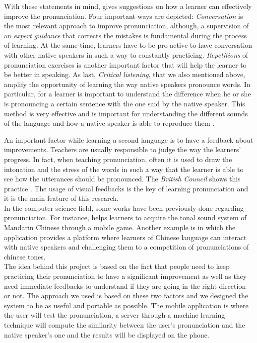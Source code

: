 \noindent With these statements in mind, \cite{gilakjani2011pronunciation} gives suggestions on how a learner can effectively improve the pronunciation. Four important ways are depicted: \textit{Conversation} is the most relevant approach to improve pronunciation, although, a supervision of an \textit{expert guidance} that corrects the mistakes is fundamental during the process of learning. At the same time, learners have to be pro-active to have conversation with other native speakers in such a way to constantly practicing. \textit{Repetitions} of pronunciation exercises is another important factor that will help the learner to be better in speaking. As last, \textit{Critical listening}, that we also mentioned above, amplify the opportunity of learning the way native speakers pronounce words. In particular, for a learner is important to understand the difference when he or she is pronouncing a certain sentence with the one said by the native speaker. This method is very effective and is important for understanding the different sounds of the language and how a native speaker is able to reproduce them \cite{rost2014listening}.

\noindent An important factor while learning a second language is to have a feedback about improvements. Teachers are usually responsible to judge the way the learners' progress. In fact, when teaching pronunciation, often it is used to draw the intonation and the stress of the words in such a way that the learner is able to see how the utterances should be pronounced. The \textit{British Council} shows this practice \cite{bbc_stress}. The usage of visual feedbacks is the key of learning pronunciation and it is the main feature of this research. \\

\noindent In the computer science field, some works have been previously done regarding pronunciation. For instance, \cite{edge2012tip} helps learners to acquire the tonal sound system of Mandarin Chinese through a mobile game. Another example is \cite{head2014tonewars} in which the application provides a platform where learners of Chinese language can interact with native speakers and challenging them to a competition of pronunciations of chinese tones. \\

\noindent The idea behind this project is based on the fact that people need to keep practicing their pronunciation to have a significant improvement as well as they need immediate feedbacks to understand if they are going in the right direction or not. The approach we used is based on these two factors and we designed the system to be as useful and portable as possible. The mobile application is where the user will test the pronunciation, a server through a machine learning technique will compute the similarity between the user's pronunciation and the native speaker's one and the results will be displayed on the phone. \\

